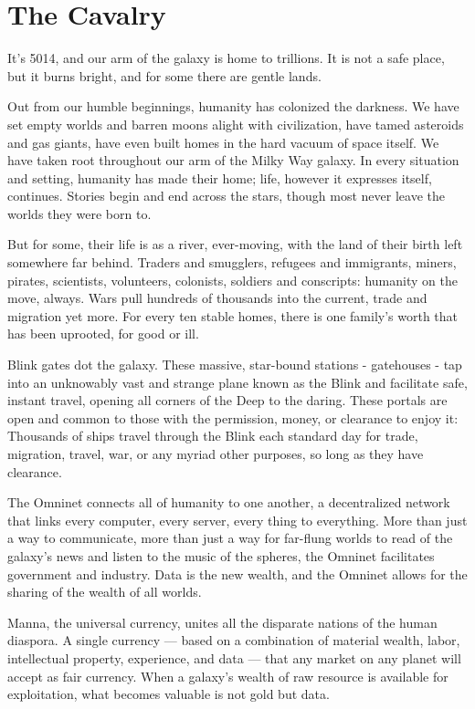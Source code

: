 \section{The Cavalry} 

It’s 5014, and our arm of the galaxy is home to trillions. It is not a safe place,  
but it burns bright, and for some there are gentle lands. 
 

Out from our humble beginnings, humanity has colonized the darkness. We have set empty  
worlds and barren moons alight with civilization, have tamed asteroids and gas giants, have even  
built homes in the hard vacuum of space itself. We have taken root throughout our arm of the  
Milky Way galaxy. In every situation and setting, humanity has made their home; life, however it  
expresses itself, continues. Stories begin and end across the stars, though most never leave the  
worlds they were born to. 
 

But for some, their life is as a river, ever-moving, with the land of their birth left somewhere far  
behind. Traders and smugglers, refugees and immigrants, miners, pirates, scientists, volunteers,  
colonists, soldiers and conscripts: humanity on the move, always. Wars pull hundreds of  
thousands into the current, trade and migration yet more. For every ten stable homes, there is  
one family’s worth that has been uprooted, for good or ill. 
 

Blink gates dot the galaxy. These massive, star-bound stations - gatehouses - tap into an  
unknowably vast and strange plane known as the Blink and facilitate safe, instant travel, opening  
all corners of the Deep to the daring. These portals are open and common to those with the  
permission, money, or clearance to enjoy it: Thousands of ships travel through the Blink each  
standard day for trade, migration, travel, war, or any myriad other purposes, so long as they have  
clearance. 
 

The Omninet connects all of humanity to one another, a decentralized network that links every  
computer, every server, every thing to everything. More than just a way to communicate, more  
than just a way for far-flung worlds to read of the galaxy’s news and listen to the music of the  
spheres, the Omninet facilitates government and industry. Data is the new wealth, and the  
Omninet allows for the sharing of the wealth of all worlds. 
 

Manna, the universal currency, unites all the disparate nations of the human diaspora. A single  
currency — based on a combination of material wealth, labor, intellectual property, experience,  
and data — that any market on any planet will accept as fair currency. When a galaxy’s wealth of  
raw resource is available for exploitation, what becomes valuable is not gold but data. 
 

